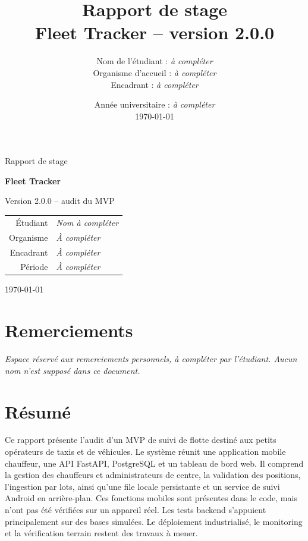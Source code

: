 \documentclass[12pt,a4paper]{article}
\title{Rapport de stage\\[0.5em]\large Fleet Tracker -- version 2.0.0}
\author{Nom de l'étudiant : \textit{à compléter}\\[0.4em]
Organisme d'accueil : \textit{à compléter}\\
Encadrant : \textit{à compléter}}
\date{Année universitaire : \textit{à compléter}\\\today}
\begin{document}
\hypersetup{pageanchor=false}
\begin{titlepage}
\centering
\vspace*{2cm}
{\Large Rapport de stage\par}
\vspace{1.2cm}
{\huge\bfseries Fleet Tracker\par}
\vspace{0.5cm}
{\Large Version 2.0.0 -- audit du MVP\par}
\vspace{2cm}
\vfill
\begin{tabular}{rl}
Étudiant & \textit{Nom à compléter}\\
Organisme & \textit{À compléter}\\
Encadrant & \textit{À compléter}\\
Période & \textit{À compléter}\\
\end{tabular}
\vfill
{\large \today\par}
\end{titlepage}

\hypersetup{pageanchor=true}
\section*{Remerciements}
\textit{Espace réservé aux remerciements personnels, à compléter par l'étudiant. Aucun nom n'est supposé dans ce document.}

\section*{Résumé}
Ce rapport présente l'audit d'un MVP de suivi de flotte destiné aux petits opérateurs de taxis et de véhicules. Le système réunit une application mobile chauffeur, une API FastAPI, PostgreSQL et un tableau de bord web. Il comprend la gestion des chauffeurs et administrateurs de centre, la validation des positions, l'ingestion par lots, ainsi qu'une file locale persistante et un service de suivi Android en arrière-plan. Ces fonctions mobiles sont présentes dans le code, mais n'ont pas été vérifiées sur un appareil réel. Les tests backend s'appuient principalement sur des bases simulées. Le déploiement industrialisé, le monitoring et la vérification terrain restent des travaux à mener.
\end{document}

